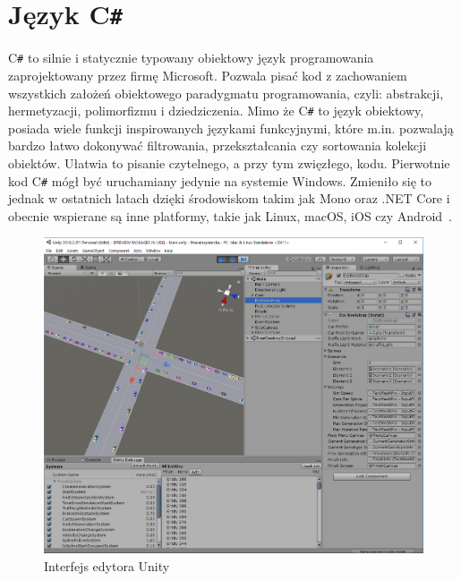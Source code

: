\section*{Język C\texttt{\#}}
C\texttt{\#} to silnie i statycznie typowany obiektowy język programowania zaprojektowany przez firmę Microsoft. Pozwala pisać kod z zachowaniem wszystkich założeń obiektowego paradygmatu programowania, czyli: abstrakcji, hermetyzacji, polimorfizmu i dziedziczenia. Mimo że C\texttt{\#} to język obiektowy, posiada wiele funkcji inspirowanych językami funkcyjnymi, które m.in. pozwalają bardzo łatwo dokonywać filtrowania, przekształcania czy sortowania kolekcji obiektów. Ułatwia to pisanie czytelnego, a przy tym zwięzłego, kodu. Pierwotnie kod C\texttt{\#} mógł być uruchamiany jedynie na systemie Windows. Zmieniło się to jednak w ostatnich latach dzięki środowiskom takim jak Mono oraz .NET Core i obecnie wspierane są inne platformy, takie jak Linux, macOS, iOS czy Android~\cite{Albahari2017}.
\begin{figure}[h!]
	\centering
	\includegraphics[width=1\linewidth]{unity}
	\caption[Interfejs edytora Unity]{Interfejs edytora Unity}
	\label{fig:unity}
\end{figure}
